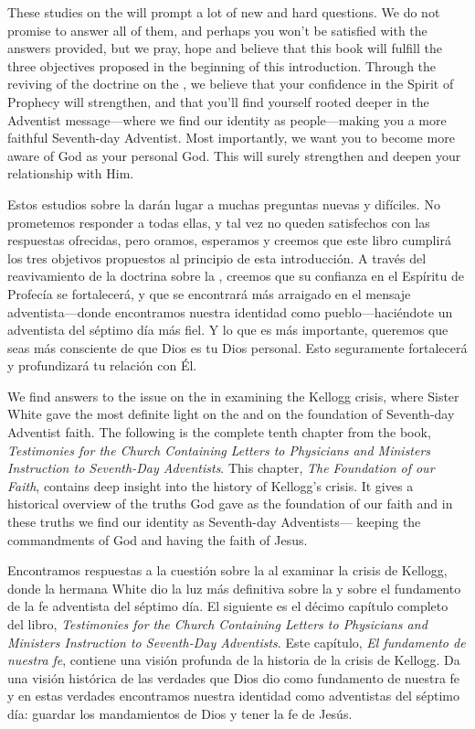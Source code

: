 These studies on the  will prompt a lot of new and hard questions. We do not promise to answer all of them, and perhaps you won’t be satisfied with the answers provided, but we pray, hope and believe that this book will fulfill the three objectives proposed in the beginning of this introduction. Through the reviving of the doctrine on the , we believe that your confidence in the Spirit of Prophecy will strengthen, and that you’ll find yourself rooted deeper in the Adventist message—where we find our identity as people—making you a more faithful Seventh-day Adventist. Most importantly, we want you to become more aware of God as your personal God. This will surely strengthen and deepen your relationship with Him.


Estos estudios sobre la  darán lugar a muchas preguntas nuevas y difíciles. No prometemos responder a todas ellas, y tal vez no queden satisfechos con las respuestas ofrecidas, pero oramos, esperamos y creemos que este libro cumplirá los tres objetivos propuestos al principio de esta introducción. A través del reavivamiento de la doctrina sobre la , creemos que su confianza en el Espíritu de Profecía se fortalecerá, y que se encontrará más arraigado en el mensaje adventista—donde encontramos nuestra identidad como pueblo—haciéndote un adventista del séptimo día más fiel. Y lo que es más importante, queremos que seas más consciente de que Dios es tu Dios personal. Esto seguramente fortalecerá y profundizará tu relación con Él.


We find answers to the issue on the  in examining the Kellogg crisis, where Sister White gave the most definite light on the  and on the foundation of Seventh-day Adventist faith. The following is the complete tenth chapter from the book, \textit{Testimonies for the Church Containing Letters to Physicians and Ministers Instruction to Seventh-Day Adventists}. This chapter, \textit{The Foundation of our Faith}, contains deep insight into the history of Kellogg’s crisis. It gives a historical overview of the truths God gave as the foundation of our faith and in these truths we find our identity as Seventh-day Adventists— keeping the commandments of God and having the faith of Jesus.


Encontramos respuestas a la cuestión sobre la  al examinar la crisis de Kellogg, donde la hermana White dio la luz más definitiva sobre la  y sobre el fundamento de la fe adventista del séptimo día. El siguiente es el décimo capítulo completo del libro, \textit{Testimonies for the Church Containing Letters to Physicians and Ministers Instruction to Seventh-Day Adventists}. Este capítulo, \textit{El fundamento de nuestra fe}, contiene una visión profunda de la historia de la crisis de Kellogg. Da una visión histórica de las verdades que Dios dio como fundamento de nuestra fe y en estas verdades encontramos nuestra identidad como adventistas del séptimo día: guardar los mandamientos de Dios y tener la fe de Jesús.

